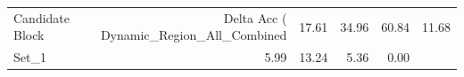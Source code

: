 \begin{tabular}{lrrrr}
\toprule
Candidate Block & Delta Acc (%
\midrule
Dynamic_Region_All_Combined & 17.61 & 34.96 & 60.84 & 11.68 \\
Set_1 & 5.99 & 13.24 & 5.36 & 0.00 \\
\bottomrule
\end{tabular}
